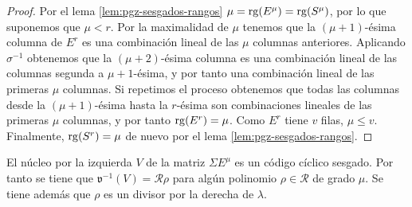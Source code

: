 \begin{proof}
  Por el lema \ref{lem:pgz-sesgados-rangos} \(\mu = \operatorname{rg}(E^{\mu}) = \operatorname{rg}(S^{\mu})\), por lo que suponemos que \(\mu < r\).
  Por la maximalidad de \(\mu\) tenemos que la \((\mu + 1)\)-ésima columna de \(E^r\) es una combinación lineal de las \(\mu\) columnas anteriores.
  Aplicando \(\sigma^{-1}\) obtenemos que la \((\mu + 2)\)-ésima columna es una combinación lineal de las columnas segunda a \(\mu + 1\)-ésima, y por tanto una combinación lineal de las primeras \(\mu\) columnas.
  Si repetimos el proceso obtenemos que todas las columnas desde la \((\mu + 1)\)-ésima hasta la \(r\)-ésima son combinaciones lineales de las primeras \(\mu\) columnas, y por tanto \(\operatorname{rg}(E^r) = \mu\).
  Como \(E^r\) tiene \(v\) filas, \(\mu \leq v\).
  Finalmente, \(\operatorname{rg}(S^r) = \mu\) de nuevo por el lema \ref{lem:pgz-sesgados-rangos}.
\end{proof}

\begin{proposition}
  \label{prop:pgz-sesgados-kernel-sesgado}
  El núcleo por la izquierda \(V\) de la matriz \(\Sigma E^{\mu}\) es un código cíclico sesgado.
  Por tanto se tiene que \(\mathfrak v^{-1}(V) = \mathcal R\rho\) para algún polinomio \(\rho \in \mathcal R\) de grado \(\mu\).
  Se tiene además que \(\rho\) es un divisor por la derecha de \(\lambda\).
\end{proposition}


